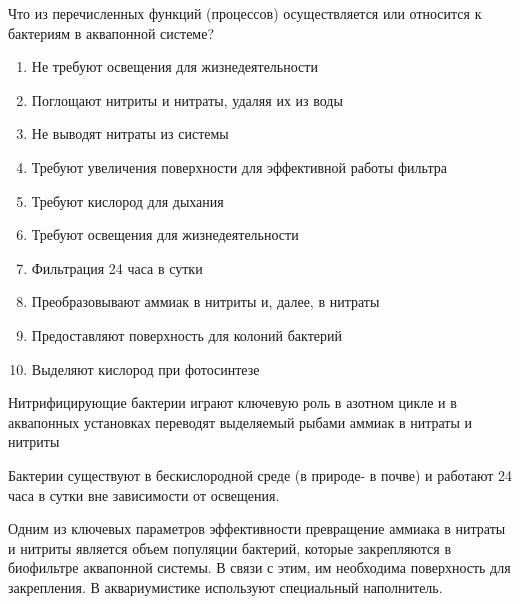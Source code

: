 
Что из перечисленных функций (процессов) осуществляется или относится к бактериям в аквапонной системе?  

\begin{enumerate}
    \item Не требуют освещения для жизнедеятельности
    \item Поглощают нитриты и нитраты, удаляя их из воды
    \item Не выводят нитраты из системы
    \item Требуют увеличения поверхности для эффективной работы фильтра
    \item Требуют кислород для дыхания
    \item Требуют освещения для жизнедеятельности
    \item Фильтрация 24 часа в сутки
    \item Преобразовывают аммиак в нитриты и, далее, в нитраты
    \item Предоставляют поверхность для колоний бактерий
    \item Выделяют кислород при фотосинтезе
\end{enumerate}

\explanationSection

Нитрифицирующие бактерии играют ключевую роль в азотном цикле и в аквапонных установках переводят выделяемый рыбами аммиак в нитраты и нитриты

Бактерии существуют в бескислородной среде (в природе- в почве) и работают 24 часа в сутки вне зависимости от освещения.  

Одним из ключевых параметров эффективности превращение аммиака в нитраты и нитриты является объем популяции бактерий, которые закрепляются в биофильтре аквапонной системы. В связи с этим, им необходима поверхность для закрепления. В аквариумистике используют специальный наполнитель.


